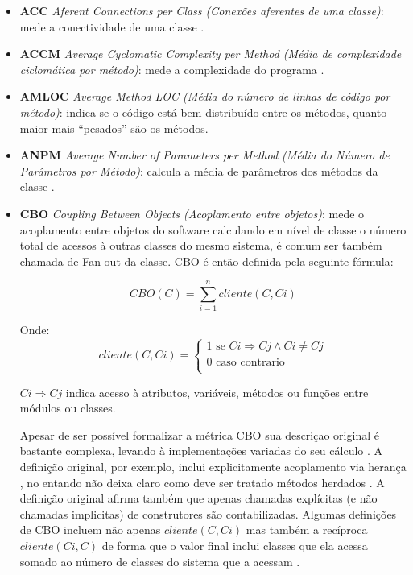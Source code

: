\begin{itemize}
  \item {\bf ACC} {\it Aferent Connections per Class (Conexões aferentes de
    uma classe)}: mede a conectividade de uma classe \cite{Brito1994}.
  \item {\bf ACCM} {\it Average Cyclomatic Complexity per Method (Média de
    complexidade ciclomática por método)}: mede a complexidade do programa
    \cite{McCabe1976}.
  \item {\bf AMLOC} {\it Average Method LOC (Média do número de linhas de
    código por método)}: indica se o código está bem distribuído entre os
    métodos, quanto maior mais ``pesados'' são os métodos.
  \item {\bf ANPM} {\it Average Number of Parameters per Method (Média do
    Número de Parâmetros por Método)}: calcula a média de parâmetros dos
    métodos da classe \cite{Jagdish1997}.
  \item {\bf CBO} {\it Coupling Between Objects (Acoplamento entre objetos)}:
    mede o acoplamento entre objetos do software \cite{Chidamber1994}
    calculando em nível de classe o número total de acessos à outras classes do
    mesmo sistema, é comum ser também chamada de Fan-out da classe. CBO é então
    definida pela seguinte fórmula:

\[ CBO(C) = \sum_{i=1}^{n} cliente(C, Ci) \]

Onde:
\[ cliente(C, Ci) =
  \begin{cases}
    1 \text{ se } Ci \Rightarrow Cj \wedge Ci \neq Cj \\
    0 \text{ caso contrario} \\
  \end{cases}
\]

$ Ci \Rightarrow Cj $ indica acesso à atributos, variáveis, métodos ou funções
entre módulos ou classes.

Apesar de ser possível formalizar a métrica CBO sua descriçao original é
bastante complexa, levando à implementações variadas do seu cálculo
\cite{Lincke2008}. A definição original, por exemplo, inclui explicitamente
acoplamento via herança \cite{Harrison1998}, no entando não deixa claro como
deve ser tratado métodos herdados \cite{Briand1999}. A definição original
afirma também que apenas chamadas explícitas (e não chamadas implicitas) de
construtores são contabilizadas. Algumas definições de CBO incluem não apenas $
cliente(C, Ci) $ mas também a recíproca $ cliente(Ci, C) $ de forma que o valor
final inclui classes que ela acessa somado ao número de classes do sistema que
a acessam \cite{Sant2008}.


\end{itemize}
